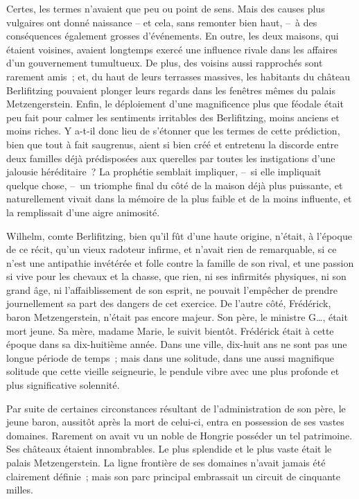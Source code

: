 \documentclass[french,twoside]{book} %
\begin{document}
Certes, les termes n’avaient que peu ou point de sens. Mais des causes plus vulgaires ont donné naissance – et cela, sans remonter bien haut, – à des conséquences également grosses d’événements. En outre, les deux maisons, qui étaient voisines, avaient longtemps exercé une influence rivale dans les affaires d’un gouvernement tumultueux. De plus, des voisins aussi rapprochés sont rarement amis ; et, du haut de leurs terrasses massives, les habitants du château Berlifitzing pouvaient plonger leurs regards dans les fenêtres mêmes du palais Metzengerstein. Enfin, le déploiement d’une magnificence plus que féodale était peu fait pour calmer les sentiments irritables des Berlifitzing, moins anciens et moins riches. Y a-t-il donc lieu de s’étonner que les termes de cette prédiction, bien que tout à fait saugrenus, aient si bien créé et entretenu la discorde entre deux familles déjà prédisposées aux querelles par toutes les instigations d’une jalousie héréditaire ? La prophétie semblait impliquer, – si elle impliquait quelque chose, – un triomphe final du côté de la maison déjà plus puissante, et naturellement vivait dans la mémoire de la plus faible et de la moins influente, et la remplissait d’une aigre animosité.\par
Wilhelm, comte Berlifitzing, bien qu’il fût d’une haute origine, n’était, à l’époque de ce récit, qu’un vieux radoteur infirme, et n’avait rien de remarquable, si ce n’est une antipathie invétérée et folle contre la famille de son rival, et une passion si vive pour les chevaux et la chasse, que rien, ni ses infirmités physiques, ni son grand âge, ni l’affaiblissement de son esprit, ne pouvait l’empêcher de prendre journellement sa part des dangers de cet exercice. De l’autre côté, Frédérick, baron Metzengerstein, n’était pas encore majeur. Son père, le ministre G…, était mort jeune. Sa mère, madame Marie, le suivit bientôt. Frédérick était à cette époque dans sa dix-huitième année. Dans une ville, dix-huit ans ne sont pas une longue période de temps ; mais dans une solitude, dans une aussi magnifique solitude que cette vieille seigneurie, le pendule vibre avec une plus profonde et plus significative solennité.\par
Par suite de certaines circonstances résultant de l’administration de son père, le jeune baron, aussitôt après la mort de celui-ci, entra en possession de ses vastes domaines. Rarement on avait vu un noble de Hongrie posséder un tel patrimoine. Ses châteaux étaient innombrables. Le plus splendide et le plus vaste était le palais Metzengerstein. La ligne frontière de ses domaines n’avait jamais été clairement définie ; mais son parc principal embrassait un circuit de cinquante milles.\par
\end{document}
